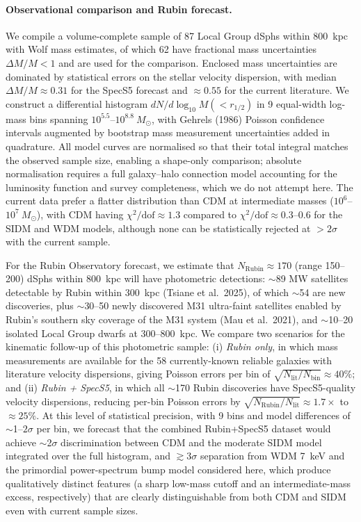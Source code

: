 \paragraph{Observational comparison and Rubin forecast.}
We compile a volume-complete sample of 87 Local Group dSphs within 800~kpc with Wolf
mass estimates, of which 62 have fractional mass uncertainties $\Delta M/M < 1$ and are
used for the comparison.
Enclosed mass uncertainties are dominated by statistical errors on the stellar velocity
dispersion, with median $\Delta M/M \approx 0.31$ for the SpecS5 forecast and
$\approx 0.55$ for the current literature.
We construct a differential histogram $dN/d\log_{10}M(<r_{1/2})$ in 9 equal-width
log-mass bins spanning $10^{5.5}$--$10^{8.8}~M_\odot$, with Gehrels (1986)
Poisson confidence intervals augmented by bootstrap mass measurement uncertainties
added in quadrature.
All model curves are normalised so that their total integral matches the observed
sample size, enabling a shape-only comparison; absolute normalisation requires a
full galaxy--halo connection model accounting for the luminosity function and survey
completeness, which we do not attempt here.
The current data prefer a flatter distribution than CDM at intermediate masses
($10^6$--$10^7~M_\odot$), with CDM having $\chi^2/\mathrm{dof} \approx 1.3$
compared to $\chi^2/\mathrm{dof} \approx 0.3$--0.6 for the SIDM and WDM models,
although none can be statistically rejected at $> 2\sigma$ with the current sample.

For the Rubin Observatory forecast, we estimate that $N_\mathrm{Rubin} \approx 170$
(range 150--200) dSphs within 800~kpc will have photometric detections:
$\sim$89 MW satellites detectable by Rubin within 300~kpc (Tsiane et al.\ 2025),
of which $\sim$54 are new discoveries, plus $\sim$30--50 newly discovered M31
ultra-faint satellites enabled by Rubin's southern sky coverage of the M31 system
(Mau et al.\ 2021), and $\sim$10--20 isolated Local Group dwarfs at 300--800~kpc.
We compare two scenarios for the kinematic follow-up of this photometric sample:
(i) \textit{Rubin only}, in which mass measurements are available for the 58
currently-known reliable galaxies with literature velocity dispersions, giving
Poisson errors per bin of $\sqrt{N_\mathrm{lit}/N_\mathrm{bin}} \approx 40\%$;
and (ii) \textit{Rubin + SpecS5}, in which all $\sim$170 Rubin discoveries have
SpecS5-quality velocity dispersions, reducing per-bin Poisson errors by
$\sqrt{N_\mathrm{Rubin}/N_\mathrm{lit}} \approx 1.7\times$ to $\approx 25\%$.
At this level of statistical precision, with 9 bins and model differences of $\sim$1--$2\sigma$
per bin, we forecast that the combined Rubin+SpecS5 dataset would achieve $\sim$2$\sigma$
discrimination between CDM and the moderate SIDM model integrated over the full histogram,
and $\gtrsim 3\sigma$ separation from WDM 7~keV and the primordial power-spectrum bump
model considered here, which produce qualitatively distinct features (a sharp low-mass
cutoff and an intermediate-mass excess, respectively) that are clearly distinguishable
from both CDM and SIDM even with current sample sizes.
